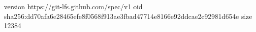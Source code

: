 version https://git-lfs.github.com/spec/v1
oid sha256:dd70afa6e28465efe8f0568f913ae3fbad47714e8166e92ddcae2c92981d654e
size 12384
